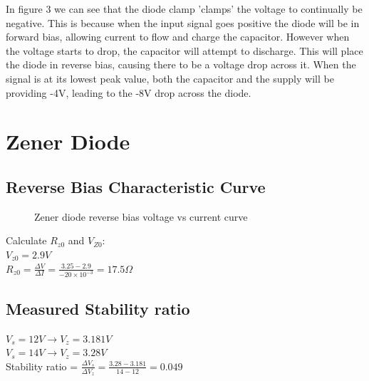 \documentclass[a4paper,11pt]{article}
\begin{document}
In figure 3 we can see that the diode clamp 'clamps' the voltage to continually be negative. 	This is because when the input signal goes positive the diode will be in forward bias, allowing current to flow and charge the capacitor. However when the voltage starts to drop, the capacitor will attempt to discharge. This will place the diode in reverse bias, causing there to be a voltage drop across it. When the signal is at its lowest peak value, both the capacitor and the supply will be providing -4V, leading to the -8V drop across the diode.
\newpage

\section{Zener Diode}
\subsection{Reverse Bias Characteristic Curve}
\begin{figure}[h]
\centering
{}
\caption{Zener diode reverse bias voltage vs current curve}
\end{figure}

Calculate $R_{z0}$ and $V_{Z0}$:\\
$V_{z0} = 2.9V$\\
$R_{z0} = \frac{\Delta V}{\Delta I}=\frac{3.25 - 2.9}{-20\times 10^{-3}} = 17.5 \Omega $

\subsection{Measured Stability ratio}
$V_s = 12V \rightarrow V_z =3.181V$\\
$V_s = 14V \rightarrow V_z =3.28V$\\
Stability ratio = $\frac{\Delta V_s}{\Delta V_z} = \frac{3.28-3.181}{14-12} = 0.049$
\end{document}
